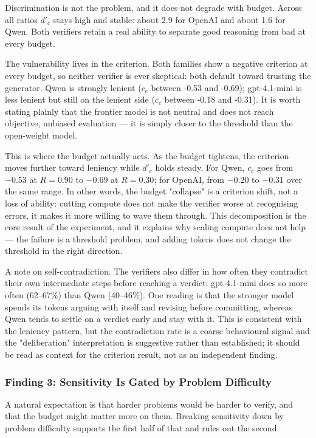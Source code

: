 \documentclass[12pt, a4paper, oneside]{report}
\begin{document}
Discrimination is not the problem, and it does not degrade with budget. Across all 
ratios $d'_c$ stays high and stable: about 2.9 for OpenAI and about 1.6 for Qwen. 
Both verifiers retain a real ability to separate good reasoning from bad at every budget.

The vulnerability lives in the criterion. Both families show a negative criterion at 
every budget, so neither verifier is ever skeptical: both default toward trusting the 
generator. Qwen is strongly lenient ($c_c$ between -0.53 and -0.69); gpt-4.1-mini is less 
lenient but still on the lenient side ($c_c$ between -0.18 and -0.31). It is worth stating
 plainly that the frontier model is not neutral and does not reach objective, unbiased
  evaluation — it is simply closer to the threshold than the open-weight model.

This is where the budget actually acts. As the budget tightens, the criterion moves 
further toward leniency while $d'_c$ holds steady. For Qwen, $c_c$ goes from $-0.53$ at $R = 0.90$ 
to $-0.69$ at $R = 0.30$; for OpenAI, from $-0.20$ to $-0.31$ over the same range. In other 
words, the budget "collapse" is a criterion shift, not a loss of ability: cutting 
compute does not make the verifier worse at recognising errors, it makes it more 
willing to wave them through. This decomposition is the core result of the experiment,
 and it explains why scaling compute does not help — the failure is a threshold problem,
  and adding tokens does not change the threshold in the right direction.

A note on self-contradiction. The verifiers also differ in how often they contradict 
their own intermediate steps before reaching a verdict: gpt-4.1-mini does so more often
 (62–67\%) than Qwen (40–46\%). One reading is that the stronger model spends its 
 tokens arguing with itself and revising before committing, whereas Qwen tends to settle
  on a verdict early and stay with it. This is consistent with the leniency pattern, but
   the contradiction rate is a coarse behavioural signal and the "deliberation" interpretation
    is suggestive rather than established; it should be read as context for the criterion
     result, not as an independent finding.


\subsubsection{Finding 3: Sensitivity Is Gated by Problem Difficulty}
A natural expectation is that harder problems would be harder to verify, and that the budget
 might matter more on them. Breaking sensitivity down by problem difficulty supports the first
  half of that and rules out the second.
\end{document}

